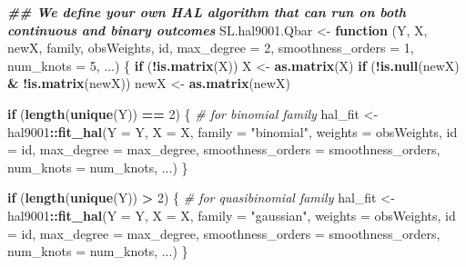 \documentclass[
]{book}
\newenvironment{Shaded}{\begin{snugshade}}{\end{snugshade}}
\newcommand{\AttributeTok}[1]{\textcolor[rgb]{0.13,0.29,0.53}{#1}}
\newcommand{\CommentTok}[1]{\textcolor[rgb]{0.56,0.35,0.01}{\textit{#1}}}
\newcommand{\ControlFlowTok}[1]{\textcolor[rgb]{0.13,0.29,0.53}{\textbf{#1}}}
\newcommand{\DecValTok}[1]{\textcolor[rgb]{0.00,0.00,0.81}{#1}}
\newcommand{\DocumentationTok}[1]{\textcolor[rgb]{0.56,0.35,0.01}{\textbf{\textit{#1}}}}
\newcommand{\FunctionTok}[1]{\textcolor[rgb]{0.13,0.29,0.53}{\textbf{#1}}}
\newcommand{\NormalTok}[1]{#1}
\newcommand{\OtherTok}[1]{\textcolor[rgb]{0.56,0.35,0.01}{#1}}
\newcommand{\SpecialCharTok}[1]{\textcolor[rgb]{0.81,0.36,0.00}{\textbf{#1}}}
\newcommand{\StringTok}[1]{\textcolor[rgb]{0.31,0.60,0.02}{#1}}
\begin{document}
\begin{Shaded}
\begin{Highlighting}[]
\DocumentationTok{\#\# We define your own HAL algorithm that can run on both continuous and binary outcomes}
\NormalTok{SL.hal9001.Qbar }\OtherTok{\textless{}{-}} \ControlFlowTok{function}\NormalTok{ (Y, X, newX, family, obsWeights, id, }\AttributeTok{max\_degree =} \DecValTok{2}\NormalTok{, }
                             \AttributeTok{smoothness\_orders =} \DecValTok{1}\NormalTok{, }\AttributeTok{num\_knots =} \DecValTok{5}\NormalTok{, ...) \{}
  \ControlFlowTok{if}\NormalTok{ (}\SpecialCharTok{!}\FunctionTok{is.matrix}\NormalTok{(X)) }
\NormalTok{    X }\OtherTok{\textless{}{-}} \FunctionTok{as.matrix}\NormalTok{(X)}
  \ControlFlowTok{if}\NormalTok{ (}\SpecialCharTok{!}\FunctionTok{is.null}\NormalTok{(newX) }\SpecialCharTok{\&} \SpecialCharTok{!}\FunctionTok{is.matrix}\NormalTok{(newX)) }
\NormalTok{    newX }\OtherTok{\textless{}{-}} \FunctionTok{as.matrix}\NormalTok{(newX)}
  
  \ControlFlowTok{if}\NormalTok{ (}\FunctionTok{length}\NormalTok{(}\FunctionTok{unique}\NormalTok{(Y)) }\SpecialCharTok{==} \DecValTok{2}\NormalTok{) \{ }\CommentTok{\# for binomial family}
\NormalTok{    hal\_fit }\OtherTok{\textless{}{-}}\NormalTok{ hal9001}\SpecialCharTok{::}\FunctionTok{fit\_hal}\NormalTok{(}\AttributeTok{Y =}\NormalTok{ Y, }\AttributeTok{X =}\NormalTok{ X, }\AttributeTok{family =} \StringTok{"binomial"}\NormalTok{, }
                                \AttributeTok{weights =}\NormalTok{ obsWeights, }\AttributeTok{id =}\NormalTok{ id, }\AttributeTok{max\_degree =}\NormalTok{ max\_degree, }
                                \AttributeTok{smoothness\_orders =}\NormalTok{ smoothness\_orders, }\AttributeTok{num\_knots =}\NormalTok{ num\_knots, }
\NormalTok{                                ...)}
\NormalTok{  \}}
  
  \ControlFlowTok{if}\NormalTok{ (}\FunctionTok{length}\NormalTok{(}\FunctionTok{unique}\NormalTok{(Y)) }\SpecialCharTok{\textgreater{}} \DecValTok{2}\NormalTok{) \{ }\CommentTok{\# for quasibinomial family}
\NormalTok{    hal\_fit }\OtherTok{\textless{}{-}}\NormalTok{ hal9001}\SpecialCharTok{::}\FunctionTok{fit\_hal}\NormalTok{(}\AttributeTok{Y =}\NormalTok{ Y, }\AttributeTok{X =}\NormalTok{ X, }\AttributeTok{family =} \StringTok{"gaussian"}\NormalTok{, }
                                \AttributeTok{weights =}\NormalTok{ obsWeights, }\AttributeTok{id =}\NormalTok{ id, }\AttributeTok{max\_degree =}\NormalTok{ max\_degree, }
                                \AttributeTok{smoothness\_orders =}\NormalTok{ smoothness\_orders, }\AttributeTok{num\_knots =}\NormalTok{ num\_knots, }
\NormalTok{                                ...)}
\NormalTok{  \}}
  

\end{Highlighting}
\end{Shaded}
\end{document}
